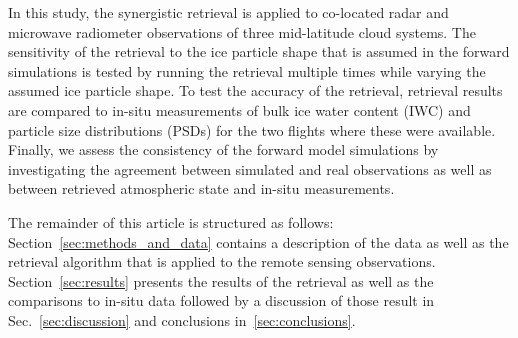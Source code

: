 \documentclass[journal abbreviation, manuscript]{copernicus}
\begin{document}


In this study, the synergistic retrieval is applied to co-located radar and
microwave radiometer observations of three mid-latitude cloud systems. The
sensitivity of the retrieval to the ice particle shape that is assumed in the
forward simulations is tested by running the retrieval multiple times while
varying the assumed ice particle shape. To test the accuracy of the retrieval,
retrieval results are compared to in-situ measurements of bulk ice water content
(IWC) and particle size distributions (PSDs) for the two flights where these
were available. Finally, we assess the consistency of the forward model
simulations by investigating the agreement between simulated and real
observations as well as between retrieved atmospheric state and in-situ
measurements.

The remainder of this article is structured as follows:
Section~\ref{sec:methods_and_data} contains a description of the data as well as
the retrieval algorithm that is applied to the remote sensing observations.
Section~\ref{sec:results} presents the results of the retrieval as well as the
comparisons to in-situ data followed by a discussion of those result in
Sec.~\ref{sec:discussion} and conclusions in~\ref{sec:conclusions}.
\end{document}
